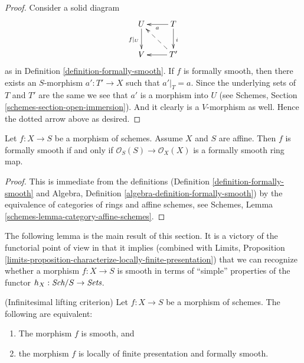 \begin{proof}
Consider a solid diagram
$$
\xymatrix{
U \ar[d]_{f|_U} & T \ar[d]^i \ar[l]^a \\
V & T' \ar[l] \ar@{-->}[lu]
}
$$
as in Definition \ref{definition-formally-smooth}. If $f$ is formally
smooth, then there exists an $S$-morphism $a' : T' \to X$ such that
$a'|_T = a$. Since the underlying sets of $T$ and $T'$ are the same
we see that $a'$ is a morphism into $U$ (see Schemes, Section
\ref{schemes-section-open-immersion}). And it clearly is a $V$-morphism
as well. Hence the dotted arrow above as desired.
\end{proof}

\begin{lemma}
\label{lemma-affine-formally-smooth}
Let $f : X \to S$ be a morphism of schemes.
Assume $X$ and $S$ are affine.
Then $f$ is formally smooth if and only if
$\mathcal{O}_S(S) \to \mathcal{O}_X(X)$ is a formally smooth
ring map.
\end{lemma}

\begin{proof}
This is immediate from the definitions
(Definition \ref{definition-formally-smooth} and
Algebra, Definition \ref{algebra-definition-formally-smooth})
by the equivalence of categories of rings and affine schemes,
see
Schemes, Lemma \ref{schemes-lemma-category-affine-schemes}.
\end{proof}

\noindent
The following lemma is the main result of this section. It is a victory of the
functorial point of view in that it implies (combined with
Limits,
Proposition \ref{limits-proposition-characterize-locally-finite-presentation})
that we can recognize whether a morphism $f : X \to S$ is smooth in terms of
``simple'' properties of the functor $h_X : \textit{Sch}/S \to \textit{Sets}$.

\begin{lemma}
\label{lemma-smooth-formally-smooth}
(Infinitesimal lifting criterion)
Let $f : X \to S$ be a morphism of schemes.
The following are equivalent:
\begin{enumerate}
\item The morphism $f$ is smooth, and
\item the morphism $f$ is locally of finite presentation and
formally smooth.
\end{enumerate}
\end{lemma}

